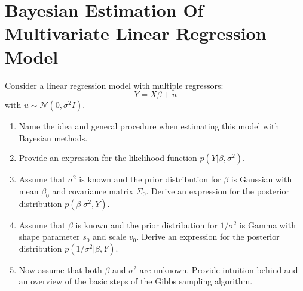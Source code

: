 \documentclass[a4paper]{scrartcl}
\begin{document}
\section{Bayesian Estimation Of Multivariate Linear Regression Model}
Consider a linear regression model with multiple regressors:
$$Y = X\beta + u$$ with $u \sim \mathcal{N}(0, \sigma^2 I)$.
\begin{enumerate}
	\item Name the idea and general procedure when estimating this model with Bayesian methods.
	\item Provide an expression for the likelihood function $p(Y|\beta,\sigma^2)$.
	\item Assume that $\sigma^2$ is known and the prior distribution for $\beta$ is Gaussian with mean $\beta_0$ and covariance matrix $\Sigma_0$. Derive an expression for the posterior distribution $p(\beta|\sigma^2,Y)$.
	\item Assume that $\beta$ is known and the prior distribution for $1/\sigma^2$ is Gamma with shape parameter $s_0$ and scale $v_0$. Derive an expression for the posterior distribution $p(1/\sigma^2|\beta,Y)$.
	\item Now assume that both $\beta$ and $\sigma^2$ are unknown. Provide intuition behind and an overview of the basic steps of the Gibbs sampling algorithm.
\end{enumerate}
\newpage
\end{document}
